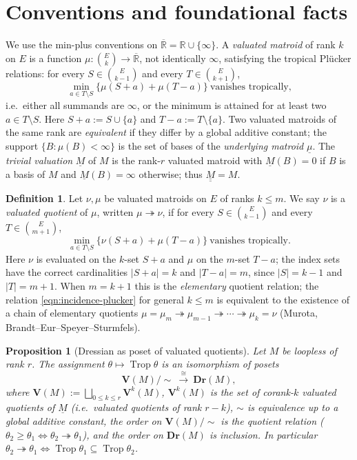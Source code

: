 \documentclass{article}
\newtheorem{proposition}[theorem]{Proposition}
\theoremstyle{definition}
\newtheorem{definition}[theorem]{Definition}
\newcommand{\Rbar}{\overline{\mathbb{R}}}
\newcommand{\R}{\mathbb{R}}
\newcommand{\Trop}{\operatorname{Trop}}
\newcommand{\onto}{\twoheadrightarrow}
\newcommand{\Dr}{\mathbf{Dr}}
\newcommand{\bV}{\mathbf V}
\begin{document}
\section{Conventions and foundational facts}\label{ssec:found}

We use the min-plus conventions on $\Rbar=\R\cup\{\infty\}$. A \emph{valuated matroid} of rank $k$
on $E$ is a function $\mu\colon\binom{E}{k}\to\Rbar$, not identically $\infty$, satisfying the
tropical Pl\"ucker relations: for every $S\in\binom{E}{k-1}$ and every $T\in\binom{E}{k+1}$,
\begin{equation}\label{eqn:plucker}
  \min_{a\in T\setminus S}\bigl\{\mu(S+a)+\mu(T-a)\bigr\}\ \text{vanishes tropically,}
\end{equation}
i.e.\ either all summands are $\infty$, or the minimum is attained for at least two
$a\in T\setminus S$. Here $S+a:=S\cup\{a\}$ and $T-a:=T\setminus\{a\}$. Two valuated matroids of the
same rank are \emph{equivalent} if they differ by a global additive constant; the support
$\{B:\mu(B)<\infty\}$ is the set of bases of the \emph{underlying matroid} $\underline\mu$. The
\emph{trivial valuation} $\underline M$ of $M$ is the rank-$r$ valuated matroid with $\underline
M(B)=0$ if $B$ is a basis of $M$ and $\underline M(B)=\infty$ otherwise; thus
$\underline{\underline M}=M$.

\begin{definition}\label{def:quotient}
Let $\nu,\mu$ be valuated matroids on $E$ of ranks $k\le m$. We say $\nu$ is a \emph{valuated
quotient} of $\mu$, written $\mu\onto\nu$, if for every $S\in\binom{E}{k-1}$ and every
$T\in\binom{E}{m+1}$,
\begin{equation}\label{eqn:incidence-plucker}
  \min_{a\in T\setminus S}\bigl\{\nu(S+a)+\mu(T-a)\bigr\}\ \text{vanishes tropically.}
\end{equation}
Here $\nu$ is evaluated on the $k$-set $S+a$ and $\mu$ on the $m$-set $T-a$; the index sets have the
correct cardinalities $|S+a|=k$ and $|T-a|=m$, since $|S|=k-1$ and $|T|=m+1$. When $m=k+1$ this is
the \emph{elementary} quotient relation; the relation \eqref{eqn:incidence-plucker} for general
$k\le m$ is equivalent to the existence of a chain of elementary quotients
$\mu=\mu_m\onto\mu_{m-1}\onto\cdots\onto\mu_k=\nu$ (Murota, Brandt--Eur--Speyer--Sturmfels).
\end{definition}

\begin{proposition}[Dressian as poset of valuated quotients]\label{fact:dressian}
Let $M$ be loopless of rank $r$. The assignment $\theta\mapsto\Trop\theta$ is an isomorphism of
posets
\[
  \bV(M)/\!\sim\ \xrightarrow{\ \cong\ }\ \Dr(M),
\]
where $\bV(M):=\bigsqcup_{0\le k\le r}\bV^{k}(M)$, $\bV^{k}(M)$ is the set of corank-$k$ valuated
quotients of $\underline M$ (i.e.\ valuated quotients of rank $r-k$), $\sim$ is equivalence up to a
global additive constant, the order on $\bV(M)/\!\sim$ is the quotient relation
($\theta_2\ge\theta_1\iff\theta_2\onto\theta_1$), and the order on $\Dr(M)$ is inclusion. In
particular $\theta_2\onto\theta_1\iff\Trop\theta_1\subseteq\Trop\theta_2$.
\end{proposition}
\end{document}
